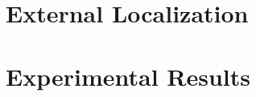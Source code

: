\section{External Localization}\label{sec:external_localization}


\section{Experimental Results}\label{sec:real_results}

%
%
%
